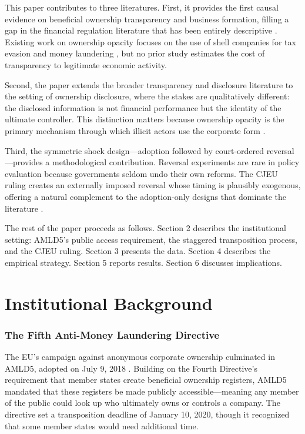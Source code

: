 \documentclass[12pt]{article}
\begin{document}
This paper contributes to three literatures. First, it provides the first causal evidence on beneficial ownership transparency and business formation, filling a gap in the financial regulation literature that has been entirely descriptive \citep{fatf2014transparency, globalwitness2021closed, findley2015global}. Existing work on ownership opacity focuses on the use of shell companies for tax evasion \citep{alstadsaeter2019tax, johannesen2014tax, zucman2013missing} and money laundering \citep{findley2015global}, but no prior study estimates the cost of transparency to legitimate economic activity.

Second, the paper extends the broader transparency and disclosure literature \citep{leuz2003earnings, bennedsen2022corporate, christensen2017capital} to the setting of ownership disclosure, where the stakes are qualitatively different: the disclosed information is not financial performance but the identity of the ultimate controller. This distinction matters because ownership opacity is the primary mechanism through which illicit actors use the corporate form \citep{fatf2014transparency}.

Third, the symmetric shock design---adoption followed by court-ordered reversal---provides a methodological contribution. Reversal experiments are rare in policy evaluation because governments seldom undo their own reforms. The CJEU ruling creates an externally imposed reversal whose timing is plausibly exogenous, offering a natural complement to the adoption-only designs that dominate the literature \citep{callaway2021difference, sun2021estimating, goodmanbacon2021difference}.

The rest of the paper proceeds as follows. Section 2 describes the institutional setting: AMLD5's public access requirement, the staggered transposition process, and the CJEU ruling. Section 3 presents the data. Section 4 describes the empirical strategy. Section 5 reports results. Section 6 discusses implications.


\section{Institutional Background}

\subsubsection*{The Fifth Anti-Money Laundering Directive} The EU's campaign against anonymous corporate ownership culminated in AMLD5, adopted on July 9, 2018 \citep{eu2018amld5}. Building on the Fourth Directive's requirement that member states create beneficial ownership registers, AMLD5 mandated that these registers be made publicly accessible---meaning any member of the public could look up who ultimately owns or controls a company. The directive set a transposition deadline of January 10, 2020, though it recognized that some member states would need additional time.
\end{document}
